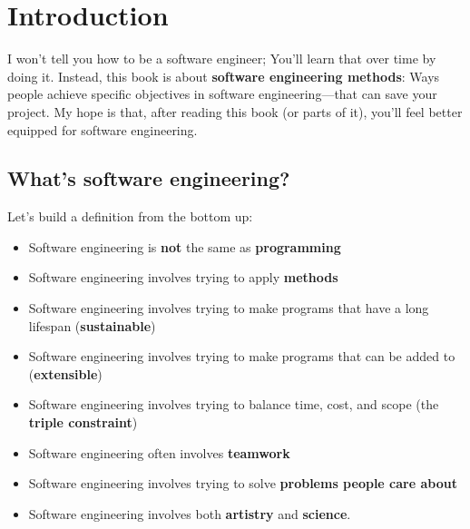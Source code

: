 \yesmargins

\chapter{Introduction}


I won't tell you how to be a software engineer; You'll learn that over time by doing it. Instead, this book is about \textbf{software engineering methods}: Ways people achieve specific objectives in software engineering---that can save your project. My hope is that, after reading this book (or parts of it), you'll feel better equipped for software engineering.

\section{What's software engineering?}

Let's build a definition from the bottom up:\\

\begin{itemize}
\item Software engineering is \textbf{not} the same as \textbf{programming}
\item Software engineering involves trying to apply \textbf{methods}
\item Software engineering involves trying to make programs that have a long lifespan (\textbf{sustainable})
\item Software engineering involves trying to make programs that can be added to\marginpar{\methodDef\margindivider}\marginpar{\sustainabilityDef\margindivider}\marginpar{\extensibleDef\margindivider}\marginpar{\tripleConstraintDef\margindivider}\marginpar{\softwareEngineeringDef} (\textbf{extensible})
\item Software engineering involves trying to balance time, cost, and scope (the \textbf{triple constraint})
\item Software engineering often involves \textbf{teamwork}
\item Software engineering involves trying to solve \textbf{problems people care about}
\item Software engineering involves both \textbf{artistry} and \textbf{science}.
\end{itemize}


